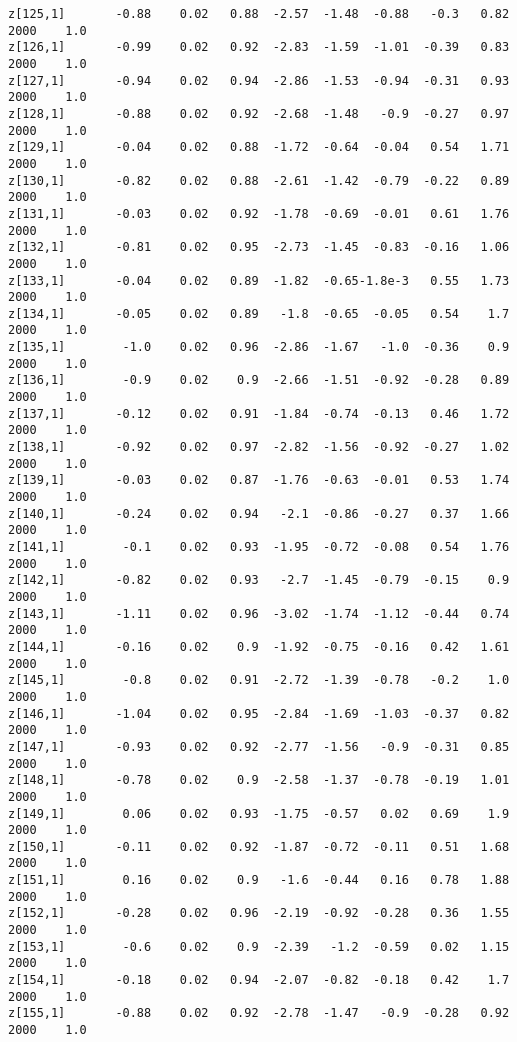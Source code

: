 \documentclass[11pt]{article}
\begin{document}
\begin{Verbatim}[commandchars=\\\{\}]
z[125,1]       -0.88    0.02   0.88  -2.57  -1.48  -0.88   -0.3   0.82   2000    1.0
z[126,1]       -0.99    0.02   0.92  -2.83  -1.59  -1.01  -0.39   0.83   2000    1.0
z[127,1]       -0.94    0.02   0.94  -2.86  -1.53  -0.94  -0.31   0.93   2000    1.0
z[128,1]       -0.88    0.02   0.92  -2.68  -1.48   -0.9  -0.27   0.97   2000    1.0
z[129,1]       -0.04    0.02   0.88  -1.72  -0.64  -0.04   0.54   1.71   2000    1.0
z[130,1]       -0.82    0.02   0.88  -2.61  -1.42  -0.79  -0.22   0.89   2000    1.0
z[131,1]       -0.03    0.02   0.92  -1.78  -0.69  -0.01   0.61   1.76   2000    1.0
z[132,1]       -0.81    0.02   0.95  -2.73  -1.45  -0.83  -0.16   1.06   2000    1.0
z[133,1]       -0.04    0.02   0.89  -1.82  -0.65-1.8e-3   0.55   1.73   2000    1.0
z[134,1]       -0.05    0.02   0.89   -1.8  -0.65  -0.05   0.54    1.7   2000    1.0
z[135,1]        -1.0    0.02   0.96  -2.86  -1.67   -1.0  -0.36    0.9   2000    1.0
z[136,1]        -0.9    0.02    0.9  -2.66  -1.51  -0.92  -0.28   0.89   2000    1.0
z[137,1]       -0.12    0.02   0.91  -1.84  -0.74  -0.13   0.46   1.72   2000    1.0
z[138,1]       -0.92    0.02   0.97  -2.82  -1.56  -0.92  -0.27   1.02   2000    1.0
z[139,1]       -0.03    0.02   0.87  -1.76  -0.63  -0.01   0.53   1.74   2000    1.0
z[140,1]       -0.24    0.02   0.94   -2.1  -0.86  -0.27   0.37   1.66   2000    1.0
z[141,1]        -0.1    0.02   0.93  -1.95  -0.72  -0.08   0.54   1.76   2000    1.0
z[142,1]       -0.82    0.02   0.93   -2.7  -1.45  -0.79  -0.15    0.9   2000    1.0
z[143,1]       -1.11    0.02   0.96  -3.02  -1.74  -1.12  -0.44   0.74   2000    1.0
z[144,1]       -0.16    0.02    0.9  -1.92  -0.75  -0.16   0.42   1.61   2000    1.0
z[145,1]        -0.8    0.02   0.91  -2.72  -1.39  -0.78   -0.2    1.0   2000    1.0
z[146,1]       -1.04    0.02   0.95  -2.84  -1.69  -1.03  -0.37   0.82   2000    1.0
z[147,1]       -0.93    0.02   0.92  -2.77  -1.56   -0.9  -0.31   0.85   2000    1.0
z[148,1]       -0.78    0.02    0.9  -2.58  -1.37  -0.78  -0.19   1.01   2000    1.0
z[149,1]        0.06    0.02   0.93  -1.75  -0.57   0.02   0.69    1.9   2000    1.0
z[150,1]       -0.11    0.02   0.92  -1.87  -0.72  -0.11   0.51   1.68   2000    1.0
z[151,1]        0.16    0.02    0.9   -1.6  -0.44   0.16   0.78   1.88   2000    1.0
z[152,1]       -0.28    0.02   0.96  -2.19  -0.92  -0.28   0.36   1.55   2000    1.0
z[153,1]        -0.6    0.02    0.9  -2.39   -1.2  -0.59   0.02   1.15   2000    1.0
z[154,1]       -0.18    0.02   0.94  -2.07  -0.82  -0.18   0.42    1.7   2000    1.0
z[155,1]       -0.88    0.02   0.92  -2.78  -1.47   -0.9  -0.28   0.92   2000    1.0

\end{Verbatim}
\end{document}
